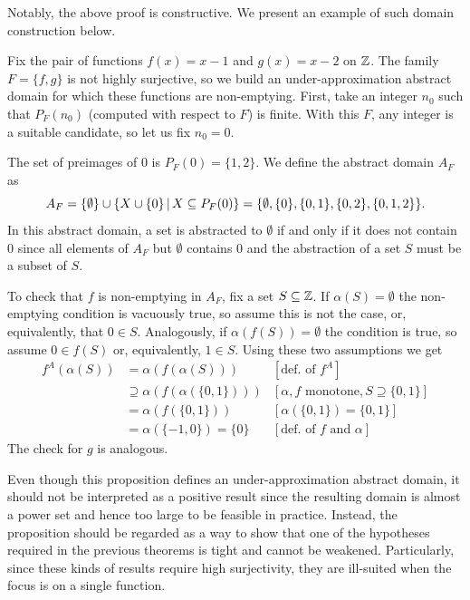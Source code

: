 Notably, the above proof is constructive. We present an example of such domain construction below.
\begin{example}\label{ex:uai:construction-ne-domain-base}
	Fix the pair of functions $f(x) = x - 1$ and $g(x) = x - 2$ on $\mathbb{Z}$. The family $F = \{ f, g \}$ is not highly surjective, so we build an under-approximation abstract domain for which these functions are non-emptying.
	First, take an integer $n_0$ such that $P_F(n_0)$ (computed with respect to $F$) is finite. With this $F$, any integer is a suitable candidate, so let us fix $n_0 = 0$.

	The set of preimages of $0$ is $P_F(0) = \{ 1, 2 \}$. We define the abstract domain $A_F$ as
	\[
	A_F = \{ \emptyset \} \cup \left\lbrace X \cup \{ 0 \} \,\vert\, X \subseteq P_F(0) \right\rbrace = \{ \emptyset, \{ 0 \}, \{ 0, 1 \}, \{ 0, 2 \}, \{ 0, 1, 2 \} \} .
	\]
	In this abstract domain, a set is abstracted to $\emptyset$ if and only if it does not contain $0$ since all elements of $A_F$ but $\emptyset$ contains $0$ and the abstraction of a set $S$ must be a subset of $S$.

	To check that $f$ is non-emptying in $A_F$, fix a set $S \subseteq \mathbb{Z}$. If $\alpha(S) = \emptyset$ the non-emptying condition is vacuously true, so assume this is not the case, or, equivalently, that $0 \in S$. Analogously, if $\alpha(f(S)) = \emptyset$ the condition is true, so assume $0 \in f(S)$ or, equivalently, $1 \in S$. Using these two assumptions we get
	\begin{align*}
		f^{A}(\alpha(S)) & = \alpha(f(\alpha(S)))                  & [\text{def. of }f^{A}]                             \\
		                 & \supseteq \alpha(f(\alpha(\{ 0, 1 \}))) & [\alpha, f \text{ monotone}, S \supseteq \{0, 1\}] \\
		                 & = \alpha(f(\{ 0, 1 \}))                 & [\alpha(\{ 0, 1 \}) = \{ 0, 1 \}]                  \\
		                 & = \alpha(\{ -1, 0 \}) = \{ 0 \}         & [\text{def. of } f \text{ and } \alpha]
	\end{align*}
	The check for $g$ is analogous.
\end{example}
Even though this proposition defines an under-approximation abstract domain, it should not be interpreted as a positive result since the resulting domain is almost a power set and hence too large to be feasible in practice. Instead, the proposition should be regarded as a way to show that one of the hypotheses required in the previous theorems is tight and cannot be weakened. Particularly, since these kinds of results require high surjectivity, they are ill-suited when the focus is on a single function.

